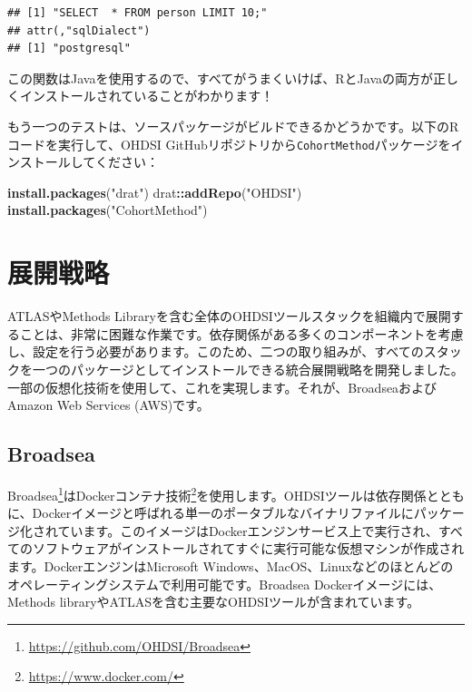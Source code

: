 \documentclass[
  11pt]{book}
\newenvironment{Shaded}{\begin{snugshade}}{\end{snugshade}}
\newcommand{\FunctionTok}[1]{\textcolor[rgb]{0.13,0.29,0.53}{\textbf{#1}}}
\newcommand{\NormalTok}[1]{#1}
\newcommand{\SpecialCharTok}[1]{\textcolor[rgb]{0.81,0.36,0.00}{\textbf{#1}}}
\newcommand{\StringTok}[1]{\textcolor[rgb]{0.31,0.60,0.02}{#1}}
\theoremstyle{definition}
\theoremstyle{definition}
\theoremstyle{definition}
\theoremstyle{definition}
\theoremstyle{remark}
\begin{document}
\begin{verbatim}
## [1] "SELECT  * FROM person LIMIT 10;"
## attr(,"sqlDialect")
## [1] "postgresql"
\end{verbatim}

この関数はJavaを使用するので、すべてがうまくいけば、RとJavaの両方が正しくインストールされていることがわかります！

もう一つのテストは、ソースパッケージがビルドできるかどうかです。以下のRコードを実行して、OHDSI GitHubリポジトリから\texttt{CohortMethod}パッケージをインストールしてください：

\begin{Shaded}
\begin{Highlighting}[]
\FunctionTok{install.packages}\NormalTok{(}\StringTok{"drat"}\NormalTok{)}
\NormalTok{drat}\SpecialCharTok{::}\FunctionTok{addRepo}\NormalTok{(}\StringTok{"OHDSI"}\NormalTok{)}
\FunctionTok{install.packages}\NormalTok{(}\StringTok{"CohortMethod"}\NormalTok{)}
\end{Highlighting}
\end{Shaded}

\section{展開戦略}\label{ux5c55ux958bux6226ux7565}

ATLASやMethods Libraryを含む全体のOHDSIツールスタックを組織内で展開することは、非常に困難な作業です。依存関係がある多くのコンポーネントを考慮し、設定を行う必要があります。このため、二つの取り組みが、すべてのスタックを一つのパッケージとしてインストールできる統合展開戦略を開発しました。一部の仮想化技術を使用して、これを実現します。それが、BroadseaおよびAmazon Web Services (AWS)です。 

\subsection{Broadsea}\label{broadsea}

Broadsea\footnote{\url{https://github.com/OHDSI/Broadsea}}はDockerコンテナ技術\footnote{\url{https://www.docker.com/}}を使用します。OHDSIツールは依存関係とともに、Dockerイメージと呼ばれる単一のポータブルなバイナリファイルにパッケージ化されています。このイメージはDockerエンジンサービス上で実行され、すべてのソフトウェアがインストールされてすぐに実行可能な仮想マシンが作成されます。DockerエンジンはMicrosoft Windows、MacOS、Linuxなどのほとんどのオペレーティングシステムで利用可能です。Broadsea Dockerイメージには、Methods libraryやATLASを含む主要なOHDSIツールが含まれています。 
\end{document}
